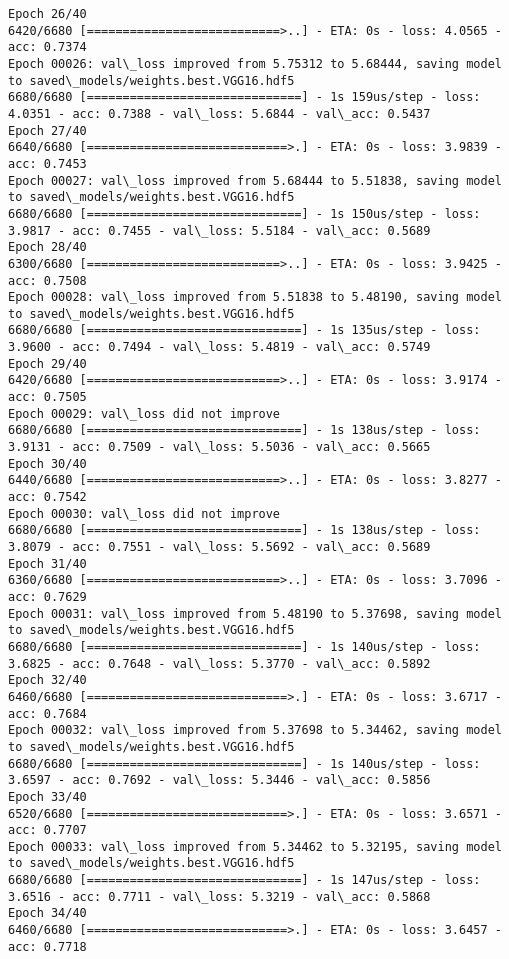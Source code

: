 \documentclass[11pt]{article}
\begin{document}
\begin{Verbatim}[commandchars=\\\{\}]
Epoch 26/40
6420/6680 [===========================>..] - ETA: 0s - loss: 4.0565 - acc: 0.7374
Epoch 00026: val\_loss improved from 5.75312 to 5.68444, saving model to saved\_models/weights.best.VGG16.hdf5
6680/6680 [==============================] - 1s 159us/step - loss: 4.0351 - acc: 0.7388 - val\_loss: 5.6844 - val\_acc: 0.5437
Epoch 27/40
6640/6680 [============================>.] - ETA: 0s - loss: 3.9839 - acc: 0.7453
Epoch 00027: val\_loss improved from 5.68444 to 5.51838, saving model to saved\_models/weights.best.VGG16.hdf5
6680/6680 [==============================] - 1s 150us/step - loss: 3.9817 - acc: 0.7455 - val\_loss: 5.5184 - val\_acc: 0.5689
Epoch 28/40
6300/6680 [===========================>..] - ETA: 0s - loss: 3.9425 - acc: 0.7508
Epoch 00028: val\_loss improved from 5.51838 to 5.48190, saving model to saved\_models/weights.best.VGG16.hdf5
6680/6680 [==============================] - 1s 135us/step - loss: 3.9600 - acc: 0.7494 - val\_loss: 5.4819 - val\_acc: 0.5749
Epoch 29/40
6420/6680 [===========================>..] - ETA: 0s - loss: 3.9174 - acc: 0.7505
Epoch 00029: val\_loss did not improve
6680/6680 [==============================] - 1s 138us/step - loss: 3.9131 - acc: 0.7509 - val\_loss: 5.5036 - val\_acc: 0.5665
Epoch 30/40
6440/6680 [===========================>..] - ETA: 0s - loss: 3.8277 - acc: 0.7542
Epoch 00030: val\_loss did not improve
6680/6680 [==============================] - 1s 138us/step - loss: 3.8079 - acc: 0.7551 - val\_loss: 5.5692 - val\_acc: 0.5689
Epoch 31/40
6360/6680 [===========================>..] - ETA: 0s - loss: 3.7096 - acc: 0.7629
Epoch 00031: val\_loss improved from 5.48190 to 5.37698, saving model to saved\_models/weights.best.VGG16.hdf5
6680/6680 [==============================] - 1s 140us/step - loss: 3.6825 - acc: 0.7648 - val\_loss: 5.3770 - val\_acc: 0.5892
Epoch 32/40
6460/6680 [============================>.] - ETA: 0s - loss: 3.6717 - acc: 0.7684
Epoch 00032: val\_loss improved from 5.37698 to 5.34462, saving model to saved\_models/weights.best.VGG16.hdf5
6680/6680 [==============================] - 1s 140us/step - loss: 3.6597 - acc: 0.7692 - val\_loss: 5.3446 - val\_acc: 0.5856
Epoch 33/40
6520/6680 [============================>.] - ETA: 0s - loss: 3.6571 - acc: 0.7707
Epoch 00033: val\_loss improved from 5.34462 to 5.32195, saving model to saved\_models/weights.best.VGG16.hdf5
6680/6680 [==============================] - 1s 147us/step - loss: 3.6516 - acc: 0.7711 - val\_loss: 5.3219 - val\_acc: 0.5868
Epoch 34/40
6460/6680 [============================>.] - ETA: 0s - loss: 3.6457 - acc: 0.7718

\end{Verbatim}
\end{document}
